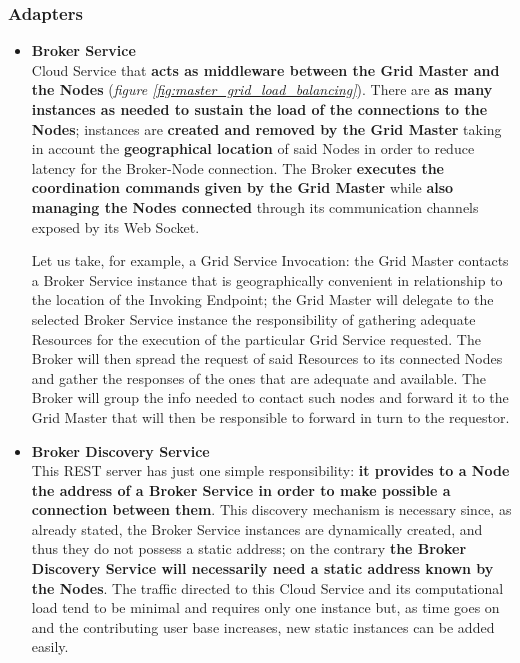 \subsubsection{Adapters}
\begin{itemize}
    \item \textbf{Broker Service}\\
    Cloud Service that \textbf{acts as middleware between the Grid Master and the Nodes} (\textit{figure \ref{fig:master_grid_load_balancing}}). There are \textbf{as many instances as needed to sustain the load of the connections to the Nodes}; instances are \textbf{created and removed by the Grid Master} taking in account the \textbf{geographical location} of said Nodes in order to reduce latency for the Broker-Node connection.
    The Broker \textbf{executes the coordination commands given by the Grid Master} while \textbf{also managing the Nodes connected} through its communication channels exposed by its Web Socket.
    
    Let us take, for example, a Grid Service Invocation: the Grid Master contacts a Broker Service instance that is geographically convenient in relationship to the location of the Invoking Endpoint; the Grid Master will delegate to the selected Broker Service instance the responsibility of gathering adequate Resources for the execution of the particular Grid Service requested. The Broker will then spread the request of said Resources to its connected Nodes and gather the responses of the ones that are adequate and available. The Broker will group the info needed to contact such nodes and forward it to the Grid Master that will then be responsible to forward in turn to the requestor.

    \item \textbf{Broker Discovery Service}\\
    This REST server has just one simple responsibility: \textbf{it provides to a Node the address of a Broker Service in order to make possible a connection between them}. This discovery mechanism is necessary since, as already stated, the Broker Service instances are dynamically created, and thus they do not possess a static address; on the contrary \textbf{the Broker Discovery Service will necessarily need a static address known by the Nodes}. The traffic directed to this Cloud Service and its computational load tend to be minimal and requires only one instance but, as time goes on and the contributing user base increases, new static instances can be added easily.


\end{itemize}
